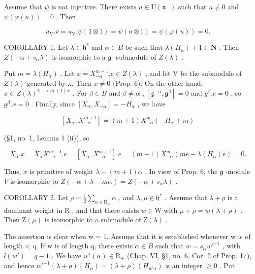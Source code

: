 Assume that \(\psi\) is not injective. There exists \(u \in \mathrm{U}(\mathfrak{n}_{-})\) such that \(u \neq 0\) and \(\psi(\varphi(u)) = 0\) . Then

\[
u _ {\mathrm{V}}. v = u _ {\mathrm{V}}. \psi (1 \otimes 1) = \psi (u \otimes 1) = \psi (\varphi (u)) = 0.
\]

COROLLARY 1. Let \(\lambda \in \mathfrak{h}^*\) and \(\alpha \in B\) be such that \(\lambda(H_{\alpha}) + 1 \in \mathbf{N}\) . Then \(Z(-\alpha + s_{\alpha}\lambda)\) is isomorphic to a \(\mathfrak{g}\) -submodule of \(Z(\lambda)\) .

Put \(m = \lambda(H_{\alpha})\) . Let \(x = X_{-\alpha}^{m+1}.e \in Z(\lambda)\) , and let V be the submodule of \(Z(\lambda)\) generated by x. Then \(x \neq 0\) (Prop. 6). On the other hand, \(x \in Z(\lambda)^{\lambda-(m+1)\alpha}\) . For \(\beta \in B\) and \(\beta \neq \alpha\) , \([\mathfrak{g}^{-\alpha}, \mathfrak{g}^{\beta}] = 0\) and \(g^{\beta}.e = 0\) , so \(g^{\beta}.x = 0\) . Finally, since \([X_{\alpha}, X_{-\alpha}] = -H_{\alpha}\) , we have

\[
[ X _ {\alpha}, X _ {- \alpha} ^ {m + 1} ] = (m + 1) X _ {- \alpha} ^ {m} (- H _ {\alpha} + m)
\]

(§1, no. 1, Lemma 1 (ii)), so

\[
X _ {\alpha}. x = X _ {\alpha} X _ {- \alpha} ^ {m + 1}. e = [ X _ {\alpha}, X _ {- \alpha} ^ {m + 1} ]. e = (m + 1) X _ {- \alpha} ^ {m} (m e - \lambda (H _ {\alpha}) e) = 0.
\]

Thus, \(x\) is primitive of weight \(\lambda - (m + 1)\alpha\) . In view of Prop. 6, the \(\mathfrak{g}\) -module \(V\) is isomorphic to \(Z(-\alpha + \lambda - m\alpha) = Z(-\alpha + s_{\alpha}\lambda)\) .

COROLLARY 2. Let \(\rho = \frac{1}{2}\sum_{\alpha \in \mathrm{R}_{+}}\alpha\) , and \(\lambda, \mu \in \mathfrak{h}^*\) . Assume that \(\lambda + \rho\) is a dominant weight in \(\mathrm{R}\) , and that there exists \(w \in \mathrm{W}\) with \(\mu + \rho = w(\lambda + \rho)\) . Then \(\mathrm{Z}(\mu)\) is isomorphic to a submodule of \(\mathrm{Z}(\lambda)\) .

The assertion is clear when w = 1. Assume that it is established whenever w is of length \textless{} q. If w is of length q, there exists \(\alpha \in B\) such that \(w = s_{\alpha}w'^{-1}\) , with \(l(w') = q - 1\) . We have \(w'(\alpha) \in \mathrm{R}_{+}\) (Chap. VI, §1, no. 6, Cor. 2 of Prop. 17), and hence \(w'^{-1}(\lambda + \rho)(H_{\alpha}) = (\lambda + \rho)(H_{w'\alpha})\) is an integer \(\geq 0\) . Put

